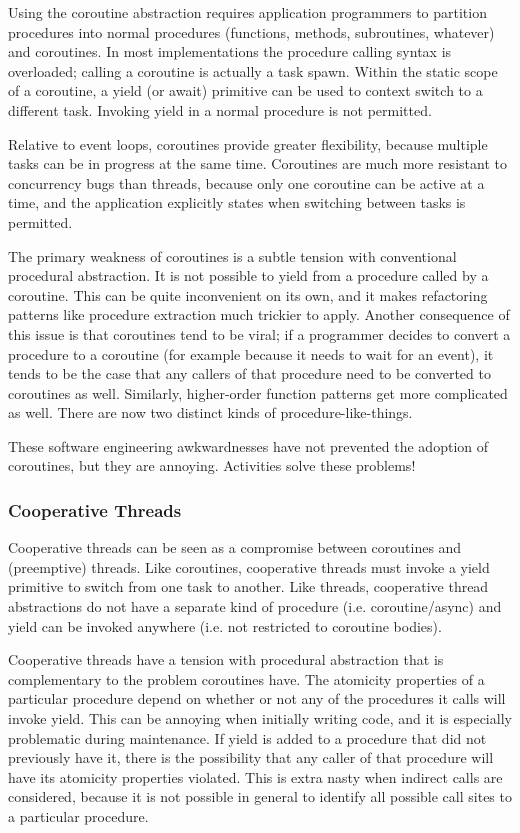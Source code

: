 \documentclass[10pt,preprint]{sigplanconf}
\begin{document}
Using the coroutine abstraction requires application programmers to partition procedures into normal procedures (functions, methods, subroutines, whatever) and coroutines.
In most implementations the procedure calling syntax is overloaded; calling a coroutine is actually a task spawn.
Within the static scope of a coroutine, a yield (or await) primitive can be used to context switch to a different task.
Invoking yield in a normal procedure is not permitted.

Relative to event loops, coroutines provide greater flexibility, because multiple tasks can be in progress at the same time.
Coroutines are much more resistant to concurrency bugs than threads, because only one coroutine can be active at a time, and the application explicitly states when switching between tasks is permitted.

The primary weakness of coroutines is a subtle tension with conventional procedural abstraction.
It is not possible to yield from a procedure called by a coroutine.
This can be quite inconvenient on its own, and it makes refactoring patterns like procedure extraction much trickier to apply.
Another consequence of this issue is that coroutines tend to be viral; if a programmer decides to convert a procedure to a coroutine (for example because it needs to wait for an event), it tends to be the case that any callers of that procedure need to be converted to coroutines as well.
Similarly, higher-order function patterns get more complicated as well.
There are now two distinct kinds of procedure-like-things.

These software engineering awkwardnesses have not prevented the adoption of coroutines, but they are annoying.
Activities solve these problems!

\subsubsection{Cooperative Threads}

Cooperative threads can be seen as a compromise between coroutines and (preemptive) threads.
Like coroutines, cooperative threads must invoke a yield primitive to switch from one task to another.
Like threads, cooperative thread abstractions do not have a separate kind of procedure (i.e. coroutine/async) and yield can be invoked anywhere (i.e. not restricted to coroutine bodies).

Cooperative threads have a tension with procedural abstraction that is complementary to the problem coroutines have.
The atomicity properties of a particular procedure depend on whether or not any of the procedures it calls will invoke yield.
This can be annoying when initially writing code, and it is especially problematic during maintenance.
If yield is added to a procedure that did not previously have it, there is the possibility that any caller of that procedure will have its atomicity properties violated.
This is extra nasty when indirect calls are considered, because it is not possible in general to identify all possible call sites to a particular procedure.
\end{document}
